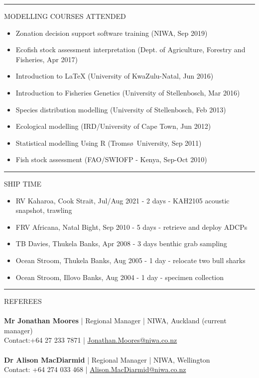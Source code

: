 \documentclass[10pt,a4paper]{article}
\begin{document}
\hrule
\vspace{6pt}
\noindent
MODELLING COURSES ATTENDED
	\begin{itemize}
		\setlength\itemsep{0.05em}
		\item Zonation decision support software training (NIWA, Sep 2019)
		\item Ecofish stock assessment interpretation (Dept. of Agriculture, Forestry and Fisheries, Apr 2017)
		\item Introduction to \LaTeX{} (University of KwaZulu-Natal, Jun 2016)
		\item Introduction to Fisheries Genetics (University of Stellenbosch, Mar 2016)
		\item Species distribution modelling (University of Stellenbosch, Feb 2013) 
		\item Ecological modelling (IRD/University of Cape Town, Jun 2012)
		\item Statistical modelling Using R (Troms\o\ University, Sep 2011)
		\item Fish stock assessment (FAO/SWIOFP - Kenya, Sep-Oct 2010)
	\end{itemize}
\hrule
\vspace{6pt}
\noindent
SHIP TIME
	\begin{itemize}
		\setlength\itemsep{0.05em}
		\item RV Kaharoa, Cook Strait, Jul/Aug 2021 - 2 days - KAH2105 acoustic snapshot, trawling
		\item FRV Africana, Natal Bight, Sep 2010 - 5 days - retrieve and deploy ADCPs
		\item TB Davies, Thukela Banks, Apr 2008 - 3 days benthic grab sampling
		\item Ocean Stroom, Thukela Banks, Aug 2005 - 1 day - relocate two bull sharks
		\item Ocean Stroom, Illovo Banks, Aug 2004 - 1 day - specimen collection
	\end{itemize}
\hrule
\vspace{6pt}
\noindent
REFEREES
\\
\\
\textbf{Mr Jonathan Moores} | Regional Manager | NIWA, Auckland (current manager)\\
Contact:+64 27 233 7871 | \href{mailto:Jonathan.Moores@niwa.co.nz}{Jonathan.Moores@niwa.co.nz}\\
\\
\textbf{Dr Alison MacDiarmid} | Regional Manager | NIWA, Wellington\\
Contact: +64 274 033 468 | \href{mailto:Alison.MacDiarmid@niwa.co.nz}{Alison.MacDiarmid@niwa.co.nz}\\
\end{document}
